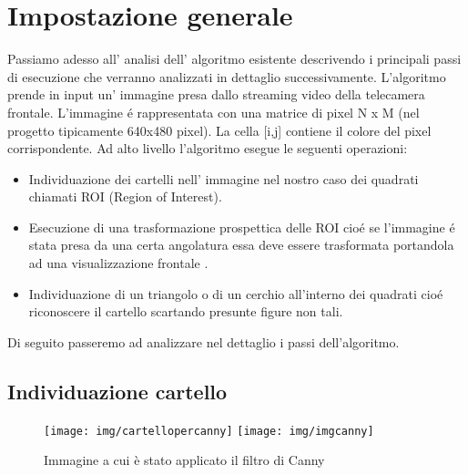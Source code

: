 \section{Impostazione generale}

	Passiamo adesso all' analisi dell' algoritmo esistente descrivendo i principali passi di esecuzione che verranno analizzati in dettaglio successivamente. 
	L'algoritmo prende in input un' immagine presa dallo streaming video della telecamera frontale. L'immagine \'e rappresentata con una matrice di pixel N x M (nel progetto tipicamente 640x480 pixel). La cella [i,j] contiene il colore del pixel corrispondente. 
	Ad alto livello l'algoritmo esegue le seguenti operazioni:
	\begin{itemize}
		\item Individuazione dei cartelli nell' immagine nel nostro caso dei quadrati chiamati ROI (Region of Interest).
		\item Esecuzione di una trasformazione prospettica delle ROI cio\'e se l'immagine \'e stata presa da una certa angolatura essa deve essere trasformata portandola ad una visualizzazione frontale .
		\item Individuazione di un triangolo o di un cerchio all'interno dei quadrati cio\'e riconoscere il cartello scartando presunte figure non tali.
	\end{itemize}
	Di seguito passeremo ad analizzare nel dettaglio i passi dell'algoritmo.

\subsection{Individuazione cartello}
	\begin{figure}[!ht]
		\centering
		\texttt{[image: img/cartellopercanny]}
		\texttt{[image: img/imgcanny]}
		\caption[Esempio filtro di Canny]{Immagine a cui è stato applicato il filtro di Canny}
	\end{figure}

